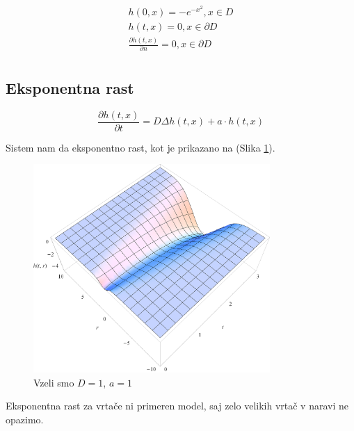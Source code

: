 \documentclass[a4paper, twoside, 12pt]{book}
\begin{document}
        \begin{equation}
          \begin{aligned}
            h(0,x) =  - e^{-x^2}, x \in D \\
            h(t,x) = 0, x \in \partial D \\
            \frac{\partial h(t,x)}{\partial n} = 0, x \in \partial D \\
          \end{aligned}
        \end{equation}

          \subsection{Eksponentna rast}

            \begin{equation}
              \frac{ \partial h(t,x) }{ \partial t} = D \Delta h(t,x) + a \cdot h(t,x)
              \label{difuzija-eksponentna-rast}
            \end{equation}

            Sistem nam da eksponentno rast, kot je prikazano na (Slika \ref{fig:difuzija-eksponentna-rast}).

            \begin{figure}[h!]
              \begin{center}
                \includegraphics[width=9cm]{slike/difuzija-eksponentna-rast2}
              \end{center}
              \caption{Vzeli smo $D=1$, $a=1$}
              \label{fig:difuzija-eksponentna-rast}
            \end{figure}

            Eksponentna rast za vrtače ni primeren model, saj zelo velikih vrtač v naravi ne opazimo.
\end{document}
